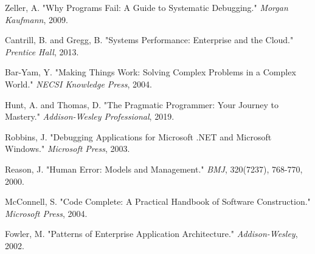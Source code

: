 \documentclass[11pt,a4paper]{article}
\begin{document}

\begin{thebibliography}{99}

Zeller, A. "Why Programs Fail: A Guide to Systematic Debugging." 
\textit{Morgan Kaufmann}, 2009.

Cantrill, B. and Gregg, B. "Systems Performance: Enterprise and the Cloud." 
\textit{Prentice Hall}, 2013.

Bar-Yam, Y. "Making Things Work: Solving Complex Problems in a Complex World." 
\textit{NECSI Knowledge Press}, 2004.

Hunt, A. and Thomas, D. "The Pragmatic Programmer: Your Journey to Mastery." 
\textit{Addison-Wesley Professional}, 2019.

Robbins, J. "Debugging Applications for Microsoft .NET and Microsoft Windows." 
\textit{Microsoft Press}, 2003.

Reason, J. "Human Error: Models and Management." 
\textit{BMJ}, 320(7237), 768-770, 2000.

McConnell, S. "Code Complete: A Practical Handbook of Software Construction." 
\textit{Microsoft Press}, 2004.

Fowler, M. "Patterns of Enterprise Application Architecture." 
\textit{Addison-Wesley}, 2002.

\end{thebibliography}
\end{document}
